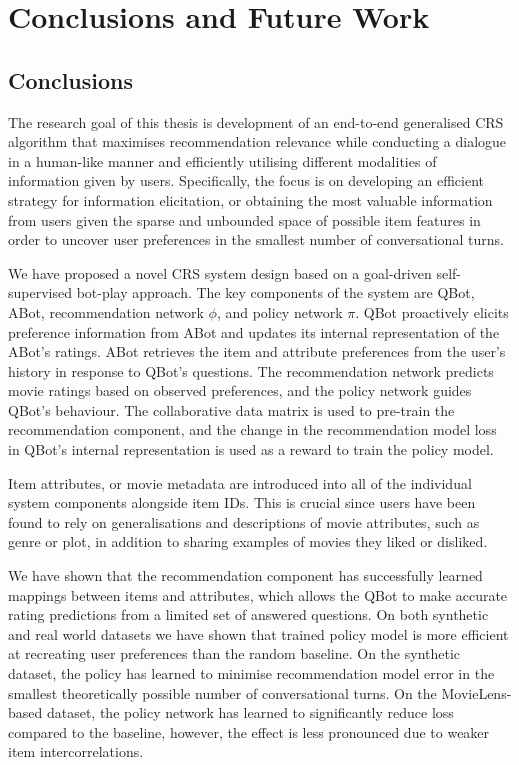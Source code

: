 \chapter{Conclusions and Future Work}
\label{ch:con}
\section{Conclusions}
The research goal of this thesis is development of an end-to-end generalised CRS algorithm that maximises recommendation relevance while conducting a dialogue in a human-like manner and efficiently utilising different modalities of information given by users. Specifically, the focus is on developing an efficient strategy for information elicitation, or obtaining the most valuable information from users given the sparse and unbounded space of possible item features in order to uncover user preferences in the smallest number of conversational turns.

We have proposed a novel CRS system design based on a goal-driven self-supervised bot-play approach. The key components of the system are QBot, ABot, recommendation network $\phi$, and policy network $\pi$. QBot proactively elicits preference information from ABot and updates its internal representation of the ABot's ratings. ABot retrieves the item and attribute preferences from the user's history in response to QBot's questions. The recommendation network predicts movie ratings based on observed preferences, and the policy network guides QBot's behaviour. The collaborative data matrix is used to pre-train the recommendation component, and the change in the recommendation model loss in QBot's internal representation is used as a reward to train the policy model. 

Item attributes, or movie metadata are introduced into all of the individual system components alongside item IDs. This is crucial since users have been found to rely on generalisations and descriptions of movie attributes, such as genre or plot, in addition to sharing examples of movies they liked or disliked. 

We have shown that the recommendation component has successfully learned mappings between items and attributes, which allows the QBot to make accurate rating predictions from a limited set of answered questions. On both synthetic and real world datasets we have shown that trained policy model is more efficient at recreating user preferences than the random baseline. On the synthetic dataset, the policy has learned to minimise recommendation model error in the smallest theoretically possible number of conversational turns. On the MovieLens-based dataset, the policy network has learned to significantly reduce loss compared to the baseline, however, the effect is less pronounced due to weaker item intercorrelations.

